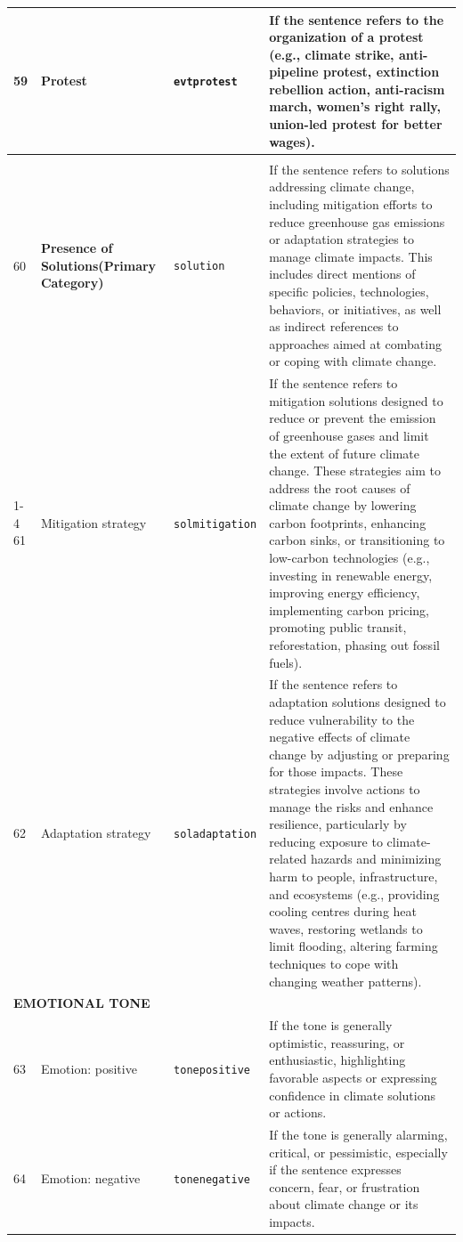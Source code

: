 \documentclass[12pt]{article}
\renewcommand\_{\texttt{\detokenize{_}\allowbreak}}
\begin{document}
{\begin{longtable}{p{0.5cm}p{4.5cm}p{2.8cm}p{13.5cm}}
59 & Protest & \texttt{evt\_protest} & If the sentence refers to the organization of a protest (e.g., climate strike, anti-pipeline protest, extinction rebellion action, anti-racism march, women's right rally, union-led protest for better wages). \\
\midrule
\rowcolor{gray!8}
\multicolumn{4}{l}{\textit{Solutions}} \\
\midrule
60 & \textbf{Presence of Solutions\newline (Primary Category)} & \texttt{solution} & If the sentence refers to solutions addressing climate change, including mitigation efforts to reduce greenhouse gas emissions or adaptation strategies to manage climate impacts. This includes direct mentions of specific policies, technologies, behaviors, or initiatives, as well as indirect references to approaches aimed at combating or coping with climate change. \\
\cmidrule(lr){1-4}
61 & Mitigation strategy & \texttt{sol\_mitigation} & If the sentence refers to mitigation solutions designed to reduce or prevent the emission of greenhouse gases and limit the extent of future climate change. These strategies aim to address the root causes of climate change by lowering carbon footprints, enhancing carbon sinks, or transitioning to low-carbon technologies (e.g., investing in renewable energy, improving energy efficiency, implementing carbon pricing, promoting public transit, reforestation, phasing out fossil fuels). \\
62 & Adaptation strategy & \texttt{sol\_adaptation} & If the sentence refers to adaptation solutions designed to reduce vulnerability to the negative effects of climate change by adjusting or preparing for those impacts. These strategies involve actions to manage the risks and enhance resilience, particularly by reducing exposure to climate-related hazards and minimizing harm to people, infrastructure, and ecosystems (e.g., providing cooling centres during heat waves, restoring wetlands to limit flooding, altering farming techniques to cope with changing weather patterns). \\
\midrule
\multicolumn{4}{l}{\cellcolor{gray!10}\textbf{EMOTIONAL TONE}} \\
63 & Emotion: positive & \texttt{tone\_positive} & If the tone is generally optimistic, reassuring, or enthusiastic, highlighting favorable aspects or expressing confidence in climate solutions or actions. \\
64 & Emotion: negative & \texttt{tone\_negative} & If the tone is generally alarming, critical, or pessimistic, especially if the sentence expresses concern, fear, or frustration about climate change or its impacts. \\

\end{longtable}}
\end{document}
